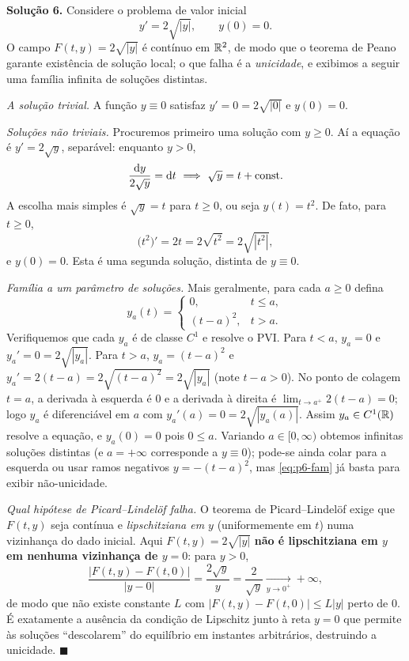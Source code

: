 \bigskip\noindent\textbf{Solução 6.}\quad
Considere o problema de valor inicial
\[
y'=2\sqrt{|y|},\qquad y(0)=0 .
\]
O campo $F(t,y)=2\sqrt{|y|}$ é contínuo em $\mathbb{R}^2$, de modo que o teorema de Peano garante existência de solução local; o que falha é a \emph{unicidade}, e exibimos a seguir uma família infinita de soluções distintas.

\emph{A solução trivial.} A função $y\equiv0$ satisfaz $y'=0=2\sqrt{|0|}$ e $y(0)=0$.

\emph{Soluções não triviais.} Procuremos primeiro uma solução com $y\ge0$. Aí a equação é $y'=2\sqrt y$, separável: enquanto $y>0$,
\[
\frac{\d y}{2\sqrt y}=\d t\ \Longrightarrow\ \sqrt y=t+\text{const}.
\]
A escolha mais simples é $\sqrt y=t$ para $t\ge0$, ou seja $y(t)=t^2$. De fato, para $t\ge0$,
\[
\big(t^2\big)'=2t=2\sqrt{t^2}=2\sqrt{|t^2|},
\]
e $y(0)=0$. Esta é uma segunda solução, distinta de $y\equiv0$.

\emph{Família a um parâmetro de soluções.} Mais geralmente, para cada $a\ge0$ defina
\begin{equation}\label{eq:p6-fam}
y_a(t)=\begin{cases}0, & t\le a,\\[2pt](t-a)^2, & t> a.\end{cases}
\end{equation}
Verifiquemos que cada $y_a$ é de classe $C^1$ e resolve o PVI. Para $t<a$, $y_a=0$ e $y_a'=0=2\sqrt{|y_a|}$. Para $t>a$, $y_a=(t-a)^2$ e $y_a'=2(t-a)=2\sqrt{(t-a)^2}=2\sqrt{|y_a|}$ (note $t-a>0$). No ponto de colagem $t=a$, a derivada à esquerda é $0$ e a derivada à direita é $\lim_{t\to a^+}2(t-a)=0$; logo $y_a$ é diferenciável em $a$ com $y_a'(a)=0=2\sqrt{|y_a(a)|}$. Assim $y_a\in C^1(\mathbb{R})$ resolve a equação, e $y_a(0)=0$ pois $0\le a$. Variando $a\in[0,\infty)$ obtemos infinitas soluções distintas (e $a=+\infty$ corresponde a $y\equiv0$); pode-se ainda colar para a esquerda ou usar ramos negativos $y=-(t-a)^2$, mas \eqref{eq:p6-fam} já basta para exibir não-unicidade.

\emph{Qual hipótese de Picard--Lindelöf falha.} O teorema de Picard--Lindelöf exige que $F(t,y)$ seja contínua e \emph{lipschitziana em $y$} (uniformemente em $t$) numa vizinhança do dado inicial. Aqui $F(t,y)=2\sqrt{|y|}$ \textbf{não é lipschitziana em $y$ em nenhuma vizinhança de $y=0$}: para $y>0$,
\[
\frac{|F(t,y)-F(t,0)|}{|y-0|}=\frac{2\sqrt y}{y}=\frac{2}{\sqrt y}\xrightarrow[y\to0^+]{}+\infty ,
\]
de modo que não existe constante $L$ com $|F(t,y)-F(t,0)|\le L|y|$ perto de $0$. É exatamente a ausência da condição de Lipschitz junto à reta $y=0$ que permite às soluções ``descolarem'' do equilíbrio em instantes arbitrários, destruindo a unicidade.
\qquad$\blacksquare$


